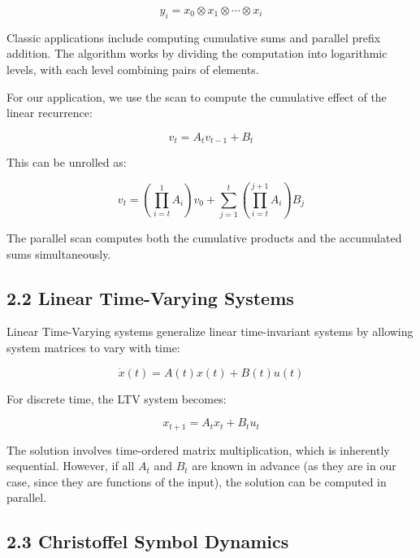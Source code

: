 \documentclass[12pt]{article}
\begin{document}
\begin{equation}
y_i = x_0 \otimes x_1 \otimes \cdots \otimes x_i
\end{equation}

Classic applications include computing cumulative sums and parallel prefix addition. The algorithm works by dividing the computation into logarithmic levels, with each level combining pairs of elements.

For our application, we use the scan to compute the cumulative effect of the linear recurrence:

\begin{equation}
v_t = A_t v_{t-1} + B_t
\end{equation}

This can be unrolled as:

\begin{equation}
v_t = \left(\prod_{i=t}^{1} A_i\right) v_0 + \sum_{j=1}^t \left(\prod_{i=t}^{j+1} A_i\right) B_j
\end{equation}

The parallel scan computes both the cumulative products and the accumulated sums simultaneously.

\subsection{2.2 Linear Time-Varying Systems}

Linear Time-Varying systems generalize linear time-invariant systems by allowing system matrices to vary with time:

\begin{equation}
\dot{x}(t) = A(t) x(t) + B(t) u(t)
\end{equation}

For discrete time, the LTV system becomes:

\begin{equation}
x_{t+1} = A_t x_t + B_t u_t
\end{equation}

The solution involves time-ordered matrix multiplication, which is inherently sequential. However, if all $A_t$ and $B_t$ are known in advance (as they are in our case, since they are functions of the input), the solution can be computed in parallel.

\subsection{2.3 Christoffel Symbol Dynamics}
\end{document}
